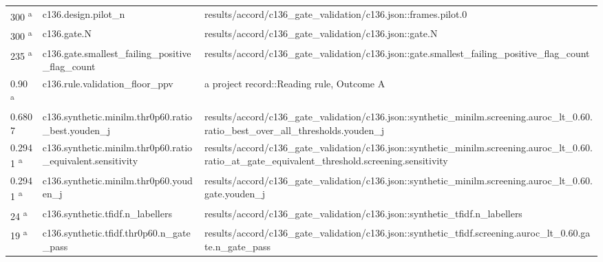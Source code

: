 \begin{longtable}{@{}p{0.7in}p{1.9in}p{2.6in}@{}}
300 \textsuperscript{a} & c136.\allowbreak{}design.\allowbreak{}pilot\_n & results/\allowbreak{}accord/\allowbreak{}c136\_gate\_validation/\allowbreak{}c136.\allowbreak{}json::frames.\allowbreak{}pilot.\allowbreak{}0\\
300 \textsuperscript{a} & c136.\allowbreak{}gate.\allowbreak{}N & results/\allowbreak{}accord/\allowbreak{}c136\_gate\_validation/\allowbreak{}c136.\allowbreak{}json::gate.\allowbreak{}N\\
235 \textsuperscript{a} & c136.\allowbreak{}gate.\allowbreak{}smallest\_failing\_positive\_flag\_count & results/\allowbreak{}accord/\allowbreak{}c136\_gate\_validation/\allowbreak{}c136.\allowbreak{}json::gate.\allowbreak{}smallest\_failing\_positive\_flag\_count\\
0.90 \textsuperscript{a} & c136.\allowbreak{}rule.\allowbreak{}validation\_floor\_ppv & a project record::Reading rule, Outcome A\\
0.6807 & c136.\allowbreak{}synthetic.\allowbreak{}minilm.\allowbreak{}thr0p60.\allowbreak{}ratio\_best.\allowbreak{}youden\_j & results/\allowbreak{}accord/\allowbreak{}c136\_gate\_validation/\allowbreak{}c136.\allowbreak{}json::synthetic\_minilm.\allowbreak{}screening.\allowbreak{}auroc\_lt\_0.\allowbreak{}60.\allowbreak{}ratio\_best\_over\_all\_thresholds.\allowbreak{}youden\_j\\
0.2941 \textsuperscript{a} & c136.\allowbreak{}synthetic.\allowbreak{}minilm.\allowbreak{}thr0p60.\allowbreak{}ratio\_equivalent.\allowbreak{}sensitivity & results/\allowbreak{}accord/\allowbreak{}c136\_gate\_validation/\allowbreak{}c136.\allowbreak{}json::synthetic\_minilm.\allowbreak{}screening.\allowbreak{}auroc\_lt\_0.\allowbreak{}60.\allowbreak{}ratio\_at\_gate\_equivalent\_threshold.\allowbreak{}screening.\allowbreak{}sensitivity\\
0.2941 \textsuperscript{a} & c136.\allowbreak{}synthetic.\allowbreak{}minilm.\allowbreak{}thr0p60.\allowbreak{}youden\_j & results/\allowbreak{}accord/\allowbreak{}c136\_gate\_validation/\allowbreak{}c136.\allowbreak{}json::synthetic\_minilm.\allowbreak{}screening.\allowbreak{}auroc\_lt\_0.\allowbreak{}60.\allowbreak{}gate.\allowbreak{}youden\_j\\
24 \textsuperscript{a} & c136.\allowbreak{}synthetic.\allowbreak{}tfidf.\allowbreak{}n\_labellers & results/\allowbreak{}accord/\allowbreak{}c136\_gate\_validation/\allowbreak{}c136.\allowbreak{}json::synthetic\_tfidf.\allowbreak{}n\_labellers\\
19 \textsuperscript{a} & c136.\allowbreak{}synthetic.\allowbreak{}tfidf.\allowbreak{}thr0p60.\allowbreak{}n\_gate\_pass & results/\allowbreak{}accord/\allowbreak{}c136\_gate\_validation/\allowbreak{}c136.\allowbreak{}json::synthetic\_tfidf.\allowbreak{}screening.\allowbreak{}auroc\_lt\_0.\allowbreak{}60.\allowbreak{}gate.\allowbreak{}n\_gate\_pass\\

\end{longtable}
